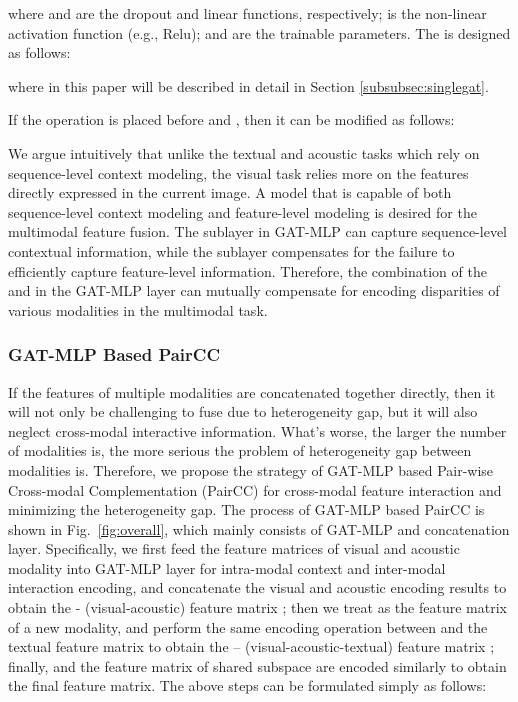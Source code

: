 \documentclass[lettersize,journal]{IEEEtran}
\begin{document}
where  and  are the dropout and linear functions, respectively;  is the non-linear activation function (e.g., Relu);  and  are the trainable parameters. The  is designed as follows:

where  in this paper will be described in detail in Section \ref{subsubsec:singlegat}.

If the  operation is placed before  and , then it can be modified as follows:


We argue intuitively that unlike the textual and acoustic tasks which rely on sequence-level context modeling, the visual task relies more on the features directly expressed in the current image. A model that is capable of both sequence-level context modeling and feature-level modeling is desired for the multimodal feature fusion. The  sublayer in GAT-MLP can capture sequence-level contextual information, while the  sublayer compensates for the failure to efficiently capture feature-level information. Therefore, the combination of the  and  in the GAT-MLP layer can mutually compensate for encoding disparities of various modalities in the multimodal task.

\subsubsection{GAT-MLP Based PairCC}\label{subsubsec:paircc}
If the features of multiple modalities are concatenated together directly, then it will not only be challenging to fuse due to heterogeneity gap, but it will also neglect cross-modal interactive information. What's worse, the larger the number of modalities is, the more serious the problem of heterogeneity gap between modalities is. Therefore, we propose the strategy of GAT-MLP based Pair-wise Cross-modal Complementation (PairCC) for cross-modal feature interaction and minimizing the heterogeneity gap. The process of GAT-MLP based PairCC is shown in Fig.~\ref{fig:overall}, which mainly consists of GAT-MLP and concatenation layer. Specifically, we first feed the feature matrices of visual and acoustic modality into GAT-MLP layer for intra-modal context and inter-modal interaction encoding, and concatenate the visual and acoustic encoding results to obtain the - (visual-acoustic) feature matrix ; then we treat  as the feature matrix of a new modality, and perform the same encoding operation between  and the textual feature matrix to obtain the -- (visual-acoustic-textual) feature matrix ; finally,  and the feature matrix of shared subspace are encoded similarly to obtain the final feature matrix. The above steps can be formulated simply as follows:
\end{document}
